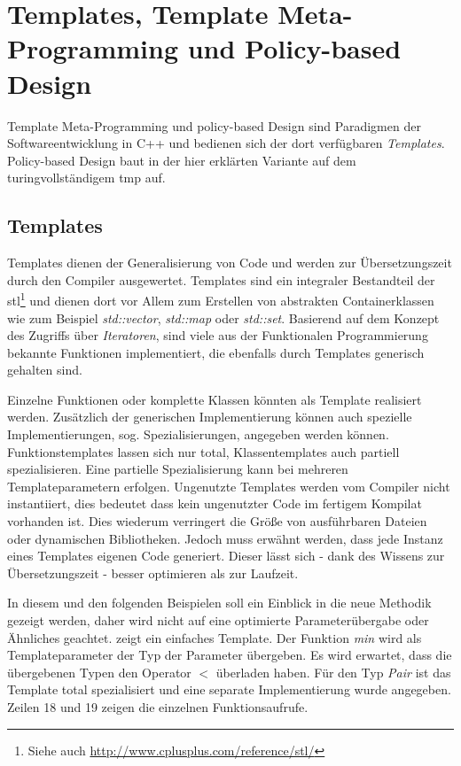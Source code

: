 \section{Templates, Template Meta-Programming und Policy-based Design}
\label{chap:impl_tmp}
Template Meta-Programming und policy-based Design \cite{Alexandrescu2001Modern} sind Paradigmen der Softwareentwicklung in C++ und bedienen sich der dort verfügbaren \emph{Templates}. Policy-based Design baut in der hier erklärten Variante auf dem turingvollständigem \ac{tmp} auf.

\subsection{Templates}
Templates dienen der Generalisierung von Code und werden zur Übersetzungszeit durch den Compiler ausgewertet. Templates sind ein integraler Bestandteil der \ac{stl}\footnote{Siehe auch \url{http://www.cplusplus.com/reference/stl/}} und dienen dort vor Allem zum Erstellen von abstrakten Containerklassen wie zum Beispiel \emph{std::vector}, \emph{std::map} oder \emph{std::set}. Basierend auf dem Konzept des Zugriffs über \emph{Iteratoren}, sind viele aus der Funktionalen Programmierung bekannte Funktionen implementiert, die ebenfalls durch Templates generisch gehalten sind.

Einzelne Funktionen oder komplette Klassen könnten als Template realisiert werden. Zusätzlich der generischen Implementierung können auch spezielle Implementierungen, sog. Spezialisierungen, angegeben werden können. Funktionstemplates lassen sich nur total, Klassentemplates auch partiell spezialisieren. Eine partielle Spezialisierung kann bei mehreren Templateparametern erfolgen. Ungenutzte Templates werden vom Compiler nicht instantiiert, dies bedeutet dass kein ungenutzter Code im fertigem Kompilat vorhanden ist. Dies wiederum verringert die Größe von ausführbaren Dateien oder dynamischen Bibliotheken. Jedoch muss erwähnt werden, dass jede Instanz eines Templates eigenen Code generiert. Dieser lässt sich - dank des Wissens zur Übersetzungszeit - besser optimieren als zur Laufzeit.

In diesem und den folgenden Beispielen soll ein Einblick in die neue Methodik gezeigt werden, daher wird nicht auf eine optimierte Parameterübergabe oder Ähnliches geachtet.  zeigt ein einfaches Template. Der Funktion \emph{min} wird als Templateparameter der Typ der Parameter übergeben. Es wird erwartet, dass die übergebenen Typen den Operator $<$ überladen haben. Für den Typ \emph{Pair} ist das Template total spezialisiert und eine separate Implementierung wurde angegeben. Zeilen 18 und 19 zeigen die einzelnen Funktionsaufrufe.

